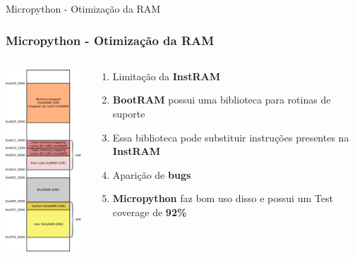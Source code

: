 \documentclass[10pt, compress]{beamer}
\begin{document}
\begin{frame}{Micropython - Otimização da RAM}
  \frametitle{Micropython - Otimização da RAM}
  \begin{columns}
    \begin{column}{0.48\textwidth}
      \begin{center}
        \includegraphics[width=95pt]{images/mem-mapping.png}\\
      \end{center}
    \end{column}
    \begin{column}{0.48\textwidth}
      \begin{center}
        \begin{enumerate}
          \item Limitação da \textbf{InstRAM} \vspace{5pt}
          \item \textbf{BootRAM} possui uma biblioteca para rotinas de suporte\vspace{5pt}
          \item Essa biblioteca pode substituir instruções presentes na \textbf{InstRAM}\vspace{5pt}
          \item Aparição de \textbf{bugs}\vspace{5pt}
          \item \textbf{Micropython} faz bom uso disso e possui um Test coverage de \textbf{92\%}\vspace{5pt}
        \end{enumerate}
      \end{center}
    \end{column}
  \end{columns}
\end{frame}
\end{document}

